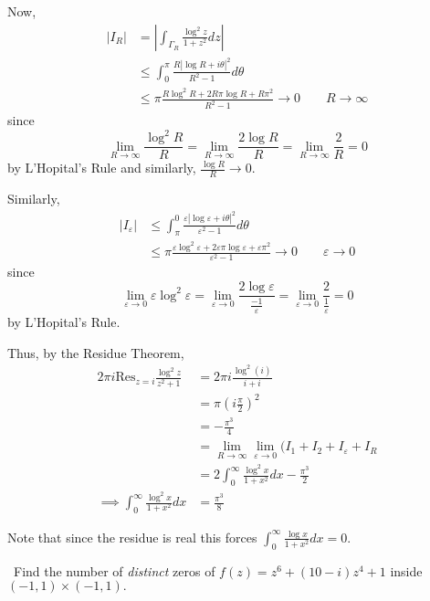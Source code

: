 \documentclass[12pt]{Homework}
\newcommand{\res}{\text{Res}}
\begin{document}
\begin{solution}
Now, \begin{align*}
    |I_R|&=\left|\int_{\Gamma_R}\frac{\log^2 z}{1+z^2}dz\right|\\
    &\le\int_0^\pi\frac{R|\log R+i\theta|^2}{R^2-1}d\theta\\
    &\le \pi\frac{R\log^2 R+2R\pi\log R+R\pi^2}{R^2-1}\to0\qquad R\to\infty
\end{align*}
 since $$\lim_{R\to\infty}\frac{\log^2R}{R}=\lim_{R\to\infty}\frac{2\log R}{R}=\lim_{R\to\infty}\frac{2}{R}=0$$ by L'Hopital's Rule and similarly, $\frac{\log R}{R}\to0$.
 
 Similarly, \begin{align*}
     |I_\varepsilon|&\le \int_\pi^0\frac{\varepsilon|\log\varepsilon+i\theta|^2}{\varepsilon^2-1}d\theta\\
     &\le \pi\frac{\varepsilon\log^2 \varepsilon+2\varepsilon\pi\log \varepsilon+\varepsilon\pi^2}{\varepsilon^2-1}\to0\qquad \varepsilon\to0
 \end{align*} since $$\lim_{\varepsilon\to0}\varepsilon\log^2\varepsilon=\lim_{\varepsilon\to0}\frac{2\log \varepsilon}{\frac{-1}{\varepsilon}}=\lim_{\varepsilon\to0}\frac{2}{\frac{1}{\varepsilon}}=0$$ by L'Hopital's Rule.
 
 Thus, by the Residue Theorem, \begin{align*}
     2\pi i\res_{z=i}\frac{\log^2 z}{z^2+1}&=2\pi i\frac{\log^2(i)}{i+i}\\
     &=\pi\left(i\frac{\pi}{2}\right)^2\\
     &=-\frac{\pi^3}{4}\\
     &=\lim_{R\to\infty}\lim_{\varepsilon\to0}(I_1+I_2+I_\varepsilon+I_R\\
     &=2\int_0^\infty\frac{\log^2 x}{1+x^2}dx-\frac{\pi^3}{2}\\
     \implies \int_0^\infty\frac{\log^2 x}{1+x^2}dx&=\frac{\pi^3}{8}
 \end{align*}
 
Note that since the residue is real this forces $\displaystyle \int_0^\infty\frac{\log x}{1+x^2}dx=0$.
\end{solution}
\newpage



\begin{problem} $\,$
Find the number of \textit{distinct} zeros of $f(z)=z^6+(10-i)z^4+1$ inside $(-1,1)\times(-1,1).$
\end{problem}
\end{document}
